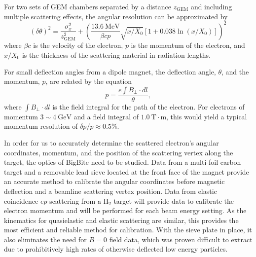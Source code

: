 For two sets of GEM chambers separated by a distance $z_\mathrm{GEM}$ and including multiple scattering effects, the angular resolution can be approximated by 
\begin{equation}
\left( \delta \theta \right)^2 = \frac{\sigma_x^2}{z_\mathrm{GEM}^2} + \left(\frac{13.6~\mathrm{MeV}}{\beta c p} \sqrt{x/X_0} \left[1+0.038\ln(x/X_0)\right]  \right)^2
\end{equation}
where $\beta c$ is the velocity of the electron, $p$ is the momentum of the electron, and $x/X_0$ is the thickness of the scattering material in radiation lengths.

For small deflection angles from a dipole magnet, the deflection angle, $\theta$, and the momentum, $p$, are related by the equation
\begin{equation}
p = \frac{ e \int B_\perp \cdot dl}{\theta},
\end{equation}
where $\int B_\perp \cdot dl$ is the field integral for the path of the electron.  
For electrons of momentum $3\sim4~\mathrm{GeV}$ and a field integral of $1.0~\mathrm{T\cdot m}$, this would yield a typical momentum resolution of $\delta p/p \approx 0.5\%$.

In order for us to accurately determine the scattered electron's angular
coordinates, momentum, and the position of the scattering vertex along the target, the optics of BigBite need to be studied.  
Data from a multi-foil carbon target and a removable lead sieve located 
at the front face of the magnet provide an accurate method to calibrate the angular coordinates 
before magnetic deflection and a beamline scattering vertex position.  
Data from elastic coincidence $ep$ scattering from a $\mathrm{H_2}$ target will provide data to calibrate the electron momentum and will be performed for each beam energy setting.  
As the kinematics for quasielastic and elastic scattering are similar, this provides the most efficient and reliable method for calibration.  
With the sieve plate in place, it also eliminates the need for $B=0$ field data, which was proven difficult to extract due to prohibitively high rates of otherwise deflected low energy particles.
\fi

